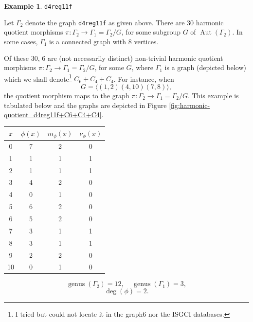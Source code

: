 \documentclass[12pt,letterpaper]{article}
\theoremstyle{definition}
\newtheorem{example}[theorem]{Example}
\DeclareMathOperator{\Aut}{Aut}
\DeclareMathOperator{\genus}{genus}
\begin{document}
\begin{example}%
\label{example:d4reg11f}
 {\tt d4reg11f}\newline
{\rm  
  Let $\Gamma_2$ denote the graph {\tt d4reg11f} as given above.
There are $30$ harmonic quotient morphisms
$\pi: \Gamma_2\to \Gamma_1=\Gamma_2/G$,
for some subgroup $G$ of $\Aut(\Gamma_2)$.
In some cases, $\Gamma_1$ is a connected graph with $8$ vertices.

Of these $30$, $6$ are (not necessarily distinct)
non-trivial harmonic quotient morphisms
$\pi: \Gamma_2\to \Gamma_1=\Gamma_2/G$, for some $G$, where
$\Gamma_1$ is a graph (depicted below) which we shall
denote\footnote{I tried but could not locate it in the graph6 nor the ISGCI databases.}
$C_6+C_4+C_4$.
For instance, when
\[
G = \langle  (1,2)(4,10)(7,8)\rangle ,
\]
the quotient morphism maps to the  graph
$\pi: \Gamma_2\to \Gamma_1=\Gamma_2/G $. This example
is tabulated below and the graphs are depicted in
Figure \ref{fig:harmonic-quotient_d4reg11f+C6+C4+C4}.

\begin{center}
\begin{tabular}{c|c|c|c}  
  $x$ & $\phi(x)$ & $m_\phi(x)$ & $\nu_\phi(x)$ \\ \hline
  0   &    7   &        2         &  0   \\ 
  1   &    1   &        1         &  1  \\ 
  2   &    1   &        1         &  1  \\ 
  3   &    4   &        2         &  0  \\ 
  4   &    0   &        1         &  0   \\
  5   &    6   &        2         &  0   \\
  6   &    5   &        2         &  0   \\
  7   &    3   &        1         &  1   \\
  8   &    3   &        1         &  1   \\
  9   &    2   &        2         &  0   \\
  10   &   0   &        1         &  0  \\   
\end{tabular}
\end{center}

\[
  \genus(\Gamma_2) =12,\ \ \ \ \
  \genus(\Gamma_1) =3,
\]
\[
\deg(\phi) =2.
\]

}
\end{example}
\end{document}
